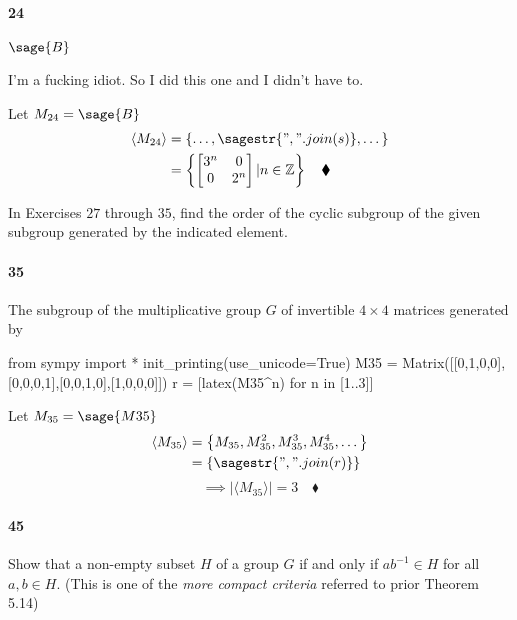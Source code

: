 \documentclass{article}
\newcommand\Z{\mathbb{Z}}
\begin{document}
\paragraph{24} $\sage{B}$

I'm a fucking idiot. So I did this one and I didn't have to.

Let $M_{24} = \sage{B}$
\begin{align*}
\langle {M_{24}}\rangle &= \left\{\dots, \sagestr{", ".join(s)}, \dots
                            \right\}\\
                          &= \left\{\begin{bmatrix}
                            3^n&0\\0&2^n\end{bmatrix}| n\in \Z\right\}\quad \blacklozenge
\end{align*}

In Exercises $27$ through $35$, find the order of the cyclic subgroup
of the given subgroup generated by the indicated element.

\paragraph{35} The subgroup of the multiplicative group $G$ of
invertible $4\times 4$ matrices generated by

\begin{sagesilent}
  from sympy import *
  init_printing(use_unicode=True)
  M35 = Matrix([[0,1,0,0],[0,0,0,1],[0,0,1,0],[1,0,0,0]])
  r = [latex(M35^n) for n in [1..3]]
\end{sagesilent}

Let $M_{35} = \sage{M35}$
\begin{align*}
  \langle {M_{35}}\rangle &=
                            \left\{M_{35},M_{35}^2,M_{35}^3,M_{35}^4,\dots\right\}\\
                        &= \left\{\sagestr{", ".join(r)}\right\}
\end{align*}
\[\implies |\langle {M_{35}}\rangle| = 3\quad \blacklozenge\]

\paragraph{45} Show that a non-empty subset $H$ of a group $G$ if and
only if $ab^{-1}\in H$ for all $a,b \in H$. (This is one of the
\textit{ more compact criteria } referred to prior Theorem 5.14)

\end{document}
